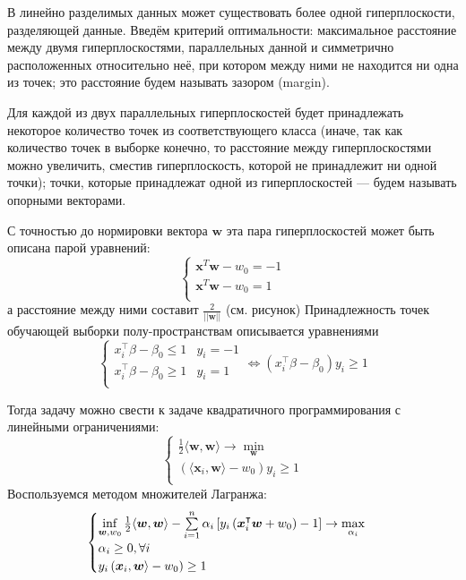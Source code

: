 \documentclass{article}
\begin{document}
В линейно разделимых данных может существовать более одной гиперплоскости, разделяющей данные.
Введём критерий оптимальности: максимальное расстояние между двумя гиперплоскостями, параллельных данной и 
симметрично расположенных относительно неё, при котором между ними не находится ни одна из точек;
это расстояние будем называть зазором (margin).

Для каждой из двух параллельных гиперплоскостей будет принадлежать некоторое количество
точек из соответствующего класса (иначе, так как количество точек в выборке конечно, то расстояние между
гиперплоскостями можно увеличить, сместив гиперплоскость, которой не принадлежит ни одной точки);
точки, которые принадлежат одной из гиперплоскостей --- будем называть опорными векторами.

С точностью до нормировки вектора $\boldsymbol{w}$ эта пара гиперплоскостей может быть описана парой уравнений:
$$
\begin{cases}
	\boldsymbol{x}^{T}\boldsymbol{w}-w_0 = -1 \\
	\boldsymbol{x}^{T}\boldsymbol{w}-w_0 = 1 \\
\end{cases}
$$
а расстояние между ними составит $\frac{2}{||{\boldsymbol{w}}||}$ (см. рисунок)
Принадлежность точек обучающей выборки полу-пространствам описывается уравнениями
$$
\begin{cases}
	x_i^\intercal \beta - \beta_0 \leq 1 & y_i=-1 \\
	x_i^\intercal \beta - \beta_0 \geq 1 & y_i=1 \\
\end{cases}
\Leftrightarrow
\left(x_i^\intercal \beta - \beta_0\right) y_i \geq 1
$$
\begin{figure}[h!]
\end{figure}

Тогда задачу можно свести к задаче квадратичного программирования с линейными ограничениями:
	$$
	\begin{cases}
		\frac{1}{2}\langle\boldsymbol{w},\boldsymbol{w}\rangle\rightarrow \min\limits_{\boldsymbol{w} }\\
		\left(\langle\boldsymbol{x}_i,\boldsymbol{w}\rangle - w_0\right)y_i \geq 1 \\
	\end{cases}
	$$
 Воспользуемся методом множителей Лагранжа:
	$$
	\begin{cases}
		\inf\limits_{\boldsymbol{w},w_0} \frac{1}{2}\langle\boldsymbol{w},\boldsymbol{w}\rangle - \sum\limits_{i=1}^n\alpha_i\left[y_i\left(\boldsymbol{x}_i^\intercal\boldsymbol{w} + w_0\right)-1\right] \rightarrow \max\limits_{\alpha_i} \\
		\alpha_i \geq 0, \forall i \\
		y_i\left(\large\boldsymbol{x}_i,\boldsymbol{w}\rangle - w_0\right) \geq 1 \\
	\end{cases}
	$$
\end{document}
